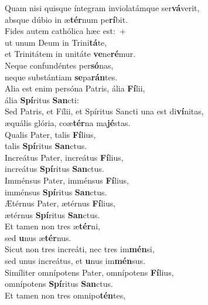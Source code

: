 \evenverse Quam nisi quisque íntegram inviolatámque ser\textbf{vá}verit,~\*\\
\evenverse absque dúbio in æ\textbf{tér}num pe\textbf{rí}bit.\\
\oddverse Fides autem cathólica hæc est:~+\\
\oddverse  ut unum Deum in Trini\textbf{tá}te,~\*\\
\oddverse et Trinitátem in unitáte \textbf{ve}ne\textbf{ré}mur.\\
\evenverse Neque confundéntes per\textbf{só}nas,~\*\\
\evenverse neque substántiam \textbf{se}pa\textbf{rán}tes.\\
\oddverse Alia est enim persóna Patris, ália \textbf{Fí}lii,~\*\\
\oddverse ália \textbf{Spí}ritus \textbf{San}cti:\\
\evenverse Sed Patris, et Fílii, et Spíritus Sancti una est di\textbf{ví}nitas,~\*\\
\evenverse æquális glória, coæ\textbf{tér}na ma\textbf{jé}stas.\\
\oddverse Qualis Pater, talis \textbf{Fí}lius,~\*\\
\oddverse talis \textbf{Spí}ritus \textbf{San}ctus.\\
\evenverse Increátus Pater, increátus \textbf{Fí}lius,~\*\\
\evenverse increátus \textbf{Spí}ritus \textbf{San}ctus.\\
\oddverse Imménsus Pater, imménsus \textbf{Fí}lius,~\*\\
\oddverse imménsus \textbf{Spí}ritus \textbf{San}ctus.\\
\evenverse Ætérnus Pater, ætérnus \textbf{Fí}lius,~\*\\
\evenverse ætérnus \textbf{Spí}ritus \textbf{San}ctus.\\
\oddverse Et tamen non tres æ\textbf{tér}ni,~\*\\
\oddverse sed \textbf{u}nus æ\textbf{tér}nus.\\
\evenverse Sicut non tres increáti, nec tres im\textbf{mén}si,~\*\\
\evenverse sed unus increátus, et \textbf{u}nus im\textbf{mén}sus.\\
\oddverse Simíliter omnípotens Pater, omnípotens \textbf{Fí}lius,~\*\\
\oddverse omnípotens \textbf{Spí}ritus \textbf{San}ctus.\\
\evenverse Et tamen non tres omnipo\textbf{tén}tes,~\*\\
